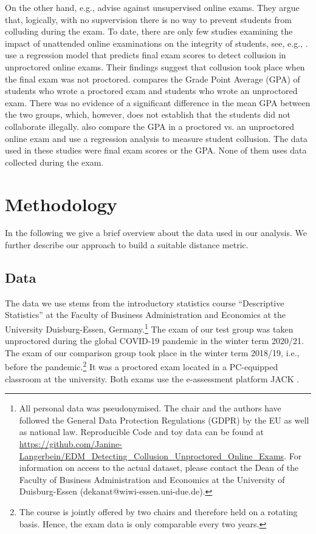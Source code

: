 \documentclass{edm_article}
\begin{document}
On the other hand, e.g., \cite{miltenburg2019online} advise against unsupervised online exams. They argue that, logically, with no supvervision there is no way to prevent students from colluding during the exam. To date, there are only few studies examining the impact of unattended online examinations on the integrity of students, see, e.g., \cite{manoharan2020upholding}. \cite{harmon2008online} use a regression model that predicts final exam scores to detect collusion in unproctored online exams. Their findings suggest that collusion took place when the final exam was not proctored. \cite{hollister2009proctored} compares the Grade Point Average (GPA) of students who wrote a proctored exam and students who wrote an unproctored exam. There was no evidence of a significant difference in the mean GPA between the two groups, which, however, does not establish that the students did not collaborate illegally. \cite{fask2015integrity} also compare the GPA in a proctored vs. an unproctored online exam and use a regression analysis to measure student collusion. The data used in these studies were final exam scores or the GPA. None of them uses data collected during the exam.

\section{Methodology}\label{sec:methodology}
In the following we give a brief overview about the data used in our analysis. We further describe our approach to build a suitable distance metric. 

\subsection{Data}\label{subsec:data}

The data we use stems from the introductory statistics course ``Descriptive Statistics'' at the Faculty of Business Administration and Economics 
at the University Duisburg-Essen, Germany.\footnote{All personal data was pseudonymised. The chair and the authors have followed the General Data Protection Regulations (GDPR) by the EU as well as national law. Reproducible Code and toy data can be found at \url{https://github.com/Janine-Langerbein/EDM_Detecting_Collusion_Unproctored_Online_Exams}.  For information on access to the actual dataset, please contact the Dean of the Faculty of Business Administration and Economics at the University of Duisburg-Essen (dekanat@wiwi-essen.uni-due.de).} %
The exam of our test group was taken unproctored during the global COVID-19 pandemic in the winter term 2020/21. The exam of our comparison group took place in the winter term 2018/19, i.e., before the pandemic.\footnote{The course is jointly offered by two chairs and therefore held on a rotating basis. Hence, the exam data is only comparable every two years.} It was a proctored exam located in a PC-equipped classroom at the university. Both exams use the e-assessment platform JACK \cite{Schwinning2017}.
\end{document}
